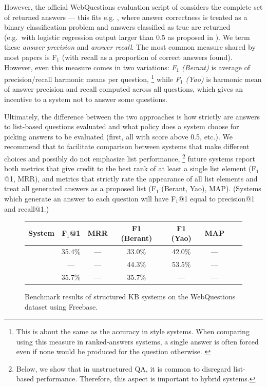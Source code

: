 However, the official WebQuestions evaluation script
of \citep{Semantic2013Berant} considers the complete set
of returned answers --- this fits e.g. \citep{TreeFreebase2014Yao},
where answer correctness is treated as a binary classification problem
and answers classified as true are returned (e.g.\ with logistic regression
output larger than 0.5 as proposed in \cite{FreebaseQA2014Yao}).
We term these \textit{answer precision} and \textit{answer recall}.
The most common measure shared by most papers is F$_1$
(with recall as a proportion of correct answers found).
However, even this measure comes in two variations:
\textit{F$_1$ (Berant)} is average of precision/recall harmonic means per question,%
\footnote{This is about the same as the accuracy in \cite{Semantic2013Berant} style systems.
When comparing using this measure in ranked-answers systems,
a single answer is often forced even if none would be produced for the question otherwise. \citep{FreebaseQA2014Yao}}
while \textit{F$_1$ (Yao)} is harmonic mean of answer precision and recall computed across all questions,
which gives an incentive to a system not to answer some questions.

Ultimately, the difference between the two approaches is how strictly are answers
to list-based questions evaluated and what policy does a system choose for
picking answers to be evaluated (first, all with score above 0.5, etc.).
We recommend that to facilitate comparison between systems that make different choices
and possibly do not emphasize list performance,%
\footnote{Below, we show that in unstructured QA, it is common to disregard list-based performance.
Therefore, this aspect is important to hybrid systems.}
future systems report both metrics that give credit to the best rank of at least
a single list element (F$_1$@1, MRR), and metrics that strictly rate the appearance
of all list elements and treat all generated answers as a proposed list (F$_1$ (Berant, Yao), MAP).
(Systems which generate an answer to each question will have F$_1$@1 equal
to precision@1 and recall@1.)

\begin{figure}[t]
\centering
\begin{tabular}{|c|ccc|cccc|}
\hline
System & F$_1$@1 & MRR  & F1 (Berant) & F1 (Yao) & MAP  \\ \hline
\cite{TreeFreebase2014Yao} &
35.4\%           & ---  & 33.0\%      & 42.0\%   & ---  \\
\cite{LeanFreebaseYao} &
---              & ---  & 44.3\%      & 53.5\%   & ---  \\
\hline
\cite{Semantic2013Berant} &
35.7\%           & ---  & 35.7\%      & ---      & ---  \\
\hline
\end{tabular}
\vspace*{-0.2cm}
\caption{Benchmark results of structured KB systems on the WebQuestions dataset using Freebase.}
\label{fig:structcompare}
\end{figure}

